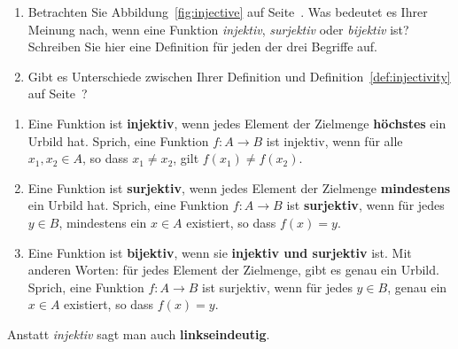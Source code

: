 \documentclass[12pt]{article}
\begin{document}
\begin{exercise}\label{ex:func_behavior}
\begin{enumerate}[label=\alph*)]
\item Betrachten Sie Abbildung~\ref{fig:injective} auf Seite~\pageref{fig:injective}. Was bedeutet es Ihrer Meinung nach, wenn eine Funktion \emph{injektiv}, \emph{surjektiv} oder \emph{bijektiv} ist? Schreiben Sie hier eine Definition für jeden der drei Begriffe auf.\\
\vspace*{5cm}
\item Gibt es Unterschiede zwischen Ihrer Definition und Definition~\ref{def:injectivity} auf Seite~\pageref{def:injectivity}?
\vspace*{3cm}
\end{enumerate}
\end{exercise}
\newpage
\begin{whitebox}
\begin{definition}\label{def:injectivity}
\begin{enumerate}[label=\alph*)]
\item Eine Funktion ist \textbf{injektiv}, wenn jedes Element der Zielmenge \textbf{höchstes} ein Urbild hat. Sprich, eine Funktion  $f: A \rightarrow B$ ist injektiv, wenn für alle $x_1, x_2 \in A$, so dass $x_1\neq x_2$, gilt $f(x_1) \neq f(x_2)$.
\item Eine Funktion ist \textbf{surjektiv}, wenn jedes Element der Zielmenge \textbf{mindestens} ein Urbild hat. Sprich, eine Funktion $f: A \rightarrow B$ ist \textbf{surjektiv}, wenn für jedes $y \in B$, mindestens ein $x\in A$ existiert, so dass $f(x) = y$.
\item Eine Funktion ist \textbf{bijektiv}, wenn sie \textbf{injektiv und surjektiv} ist. Mit anderen Worten: für jedes Element der Zielmenge, gibt es genau ein Urbild. Sprich, eine Funktion $f: A \rightarrow B$ ist surjektiv, wenn für jedes $y \in B$, genau ein $x\in A$ existiert, so dass $f(x) = y$.
\end{enumerate}
\end{definition}
\end{whitebox}

\begin{remark}
Anstatt \emph{injektiv} sagt man auch \textbf{linkseindeutig}.
\end{remark}
\end{document}
